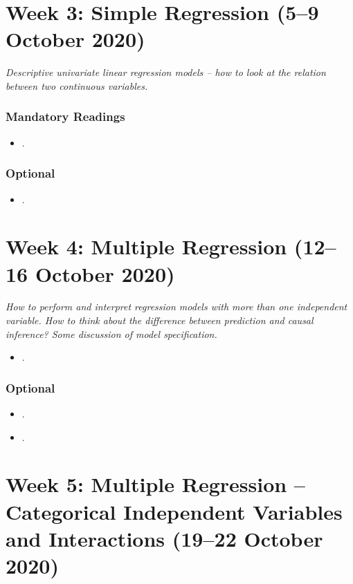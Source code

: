 \documentclass[abstract=on,parskip=full,headings=standardclasses,fontsize=11pt,paper=a4]{scrartcl}
\begin{document}
\section{Week 3: Simple Regression (5--9 October 2020)}

\textit{Descriptive univariate linear regression models -- how to look at the relation between two continuous variables.}


\subsubsection*{Mandatory Readings}

\begin{itemize}
\item {}.
\end{itemize}


\subsubsection*{Optional}
\begin{itemize}
\item {}.
\end{itemize}


\section{Week 4:  Multiple Regression (12--16 October 2020)}

\textit{How to perform and interpret regression models with more than one independent variable. How to think about the difference between prediction and causal inference? Some discussion of model specification.}


\begin{itemize}
\item {}.
\end{itemize}

\subsubsection*{Optional}
\begin{itemize}
\item {}.
\item {}.
\end{itemize}


\section{Week 5: Multiple Regression -- Categorical Independent Variables and Interactions (19--22 October 2020)}
\end{document}
